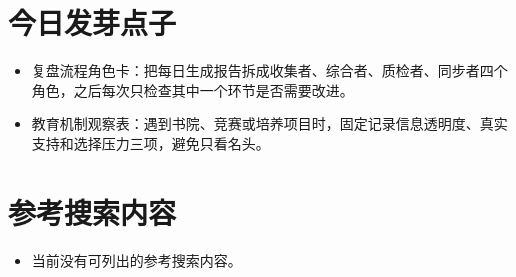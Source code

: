 \documentclass[UTF8,zihao=-4]{ctexart}
\begin{document}
\section*{今日发芽点子}
\begin{itemize}[leftmargin=2em]
\item 复盘流程角色卡：把每日生成报告拆成收集者、综合者、质检者、同步者四个角色，之后每次只检查其中一个环节是否需要改进。
\item 教育机制观察表：遇到书院、竞赛或培养项目时，固定记录信息透明度、真实支持和选择压力三项，避免只看名头。
\end{itemize}
\section*{参考搜索内容}
\begin{itemize}[leftmargin=2em]
\item 当前没有可列出的参考搜索内容。
\end{itemize}
\end{document}

